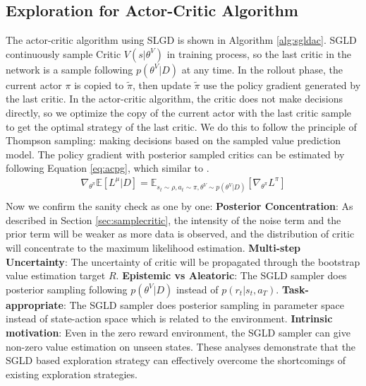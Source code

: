 \subsection{Exploration for Actor-Critic Algorithm}
The actor-critic algorithm using SLGD is shown in Algorithm \ref{alg:sgldac}. SGLD continuously sample Critic $V(s|\theta^V)$ in training process, so the last critic in the network is a sample following $p(\theta^V|D)$ at any time. In the rollout phase, the current actor $\pi$ is copied to $\tilde\pi$, then update $\tilde\pi$ use the policy gradient generated by the last critic. In the actor-critic algorithm, the critic does not make decisions directly, so we optimize the copy of the current actor with the last critic sample to get the optimal strategy of the last critic. We do this to follow the principle of Thompson sampling: making decisions based on the sampled value prediction model. The policy gradient with posterior sampled critics can be estimated by following Equation \ref{eq:acpg}, which similar to \cite{dropoutInference}.
\begin{equation}
   \label{eq:acpg} 
   \begin{aligned}
   \nabla_{\theta^\pi}\mathbb{E}[L^\mu|D] = \mathbb{E}_{s_t\sim\rho,a_t\sim\pi,\theta^V\sim p(\theta^V|D)}[\nabla_{\theta^\pi}L^\pi]\\
   \end{aligned}
\end{equation}
Now we confirm the sanity check as \cite{osband2018randomized} one by one: \textbf{Posterior Concentration}: As described in Section \ref{sec:samplecritic}, the intensity of the noise term and the prior term will be weaker as more data is observed, and the distribution of critic will concentrate to the maximum likelihood estimation. \textbf{Multi-step Uncertainty}: The uncertainty of critic will be propagated through the bootstrap value estimation target $R$. \textbf{Epistemic vs Aleatoric}: The SGLD sampler does posterior sampling following $p(\theta^V|D)$ instead of $p(r_t|s_t,a_T)$. \textbf{Task-appropriate}: The SGLD sampler does posterior sampling in parameter space instead of state-action space which is related to the environment. \textbf{Intrinsic motivation}: Even in the zero reward environment, the SGLD sampler can give non-zero value estimation on unseen states. These analyses demonstrate that the SGLD based exploration strategy can effectively overcome the shortcomings of existing exploration strategies.